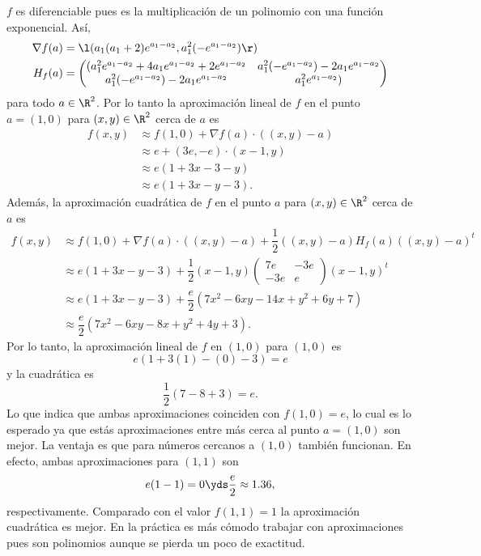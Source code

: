 \documentclass[a4,11pt]{aleph-examen}
\begin{document}
\begin{preguntas}
\begin{respuesta}
\begin{respuesta}
\begin{respuesta}
    $f$ es diferenciable pues es la multiplicación de un polinomio con una función exponencial. Así,
    \begin{align*}
        \nabla f(a)&= \l(a_1 (a_1 + 2) e^{a_1 - a_2}, a_1^2 (-e^{a_1 - a_2})\r)\\
        H_f(a)&=
        \begin{pmatrix}
            (a_1^2 e^{a_1 - a_2} + 4 a_1 e^{a_1 - a_2} + 2 e^{a_1 - a_2} & a_1^2 (-e^{a_1 - a_2}) - 2 a_1 e^{a_1 - a_2}\\
            a_1^2 (-e^{a_1 - a_2}) - 2 a_1 e^{a_1 - a_2} & a_1^2 e^{a_1 - a_2})  
        \end{pmatrix}
    \end{align*}
    para todo $a\in\R^2$. Por lo tanto la aproximación lineal de $f$ en el punto $a=(1,0)$ para $(x,y)\in\R^2$ cerca de $a$ es
    \begin{align*}
        f(x,y)
        &\approx f(1,0)+\nabla f (a) \cdot ((x,y)-a)\\
        &\approx e+(3e,-e) \cdot (x-1,y)\\
        &\approx e(1+3x-3-y)\\
        &\approx e(1+3x-y-3).
    \end{align*}
    Además, la aproximación cuadrática de $f$ en el punto $a$ para $(x,y)\in\R^2$ cerca de $a$ es
    \begin{align*}
        f(x,y)
        &\approx f(1,0)+\nabla f (a) \cdot ((x,y)-a)+\dfrac1 2 ((x,y)-a) H_f(a) ((x,y)-a)^t\\
        &\approx e(1+3x-y-3)+\dfrac1 2 (x-1,y) 
        \begin{pmatrix}
            7e & -3e\\ 
            -3e &e
        \end{pmatrix}
        (x-1,y)^t\\
        &\approx e(1+3x-y-3)+\dfrac{e}2(7 x^2 - 6 x y - 14 x + y^2 + 6 y + 7)\\
        &\approx \dfrac{e}{2}(7 x^2 - 6 x y - 8 x + y^2 + 4 y + 3).
    \end{align*}
    Por lo tanto, la aproximación lineal de $f$ en $(1,0)$ para $(1,0)$ es
    \[
        e(1+3(1)-(0)-3)=e
    \]
    y la cuadrática es
    \[
        \dfrac{1}{2}(7-8+3)=e.
    \]
    Lo que indica que ambas aproximaciones coinciden con $f(1,0)=e$, lo cual es lo esperado ya que estás aproximaciones entre más cerca al punto $a=(1,0)$ son mejor. La ventaja es que para números cercanos a $(1,0)$ también funcionan. En efecto, ambas aproximaciones para $(1,1)$ son
    \[
        e(1-1)= 0 \yds \dfrac{e}2\approx 1.36,
    \]
    respectivamente. Comparado con el valor $f(1,1)=1$ la aproximación cuadrática es mejor. En la práctica es más cómodo trabajar con aproximaciones pues son polinomios aunque se pierda un poco de exactitud.
\end{respuesta}


\end{respuesta}
\end{respuesta}
\end{preguntas}
\end{document}
